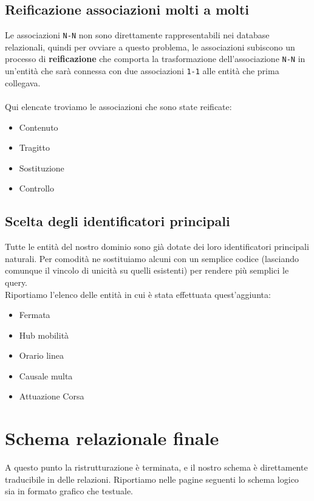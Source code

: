 \documentclass[12pt,a4paper]{report}
\begin{document}
\subsection{Reificazione associazioni molti a molti}
Le associazioni \texttt{N-N} non sono direttamente rappresentabili nei database relazionali, quindi per ovviare a questo problema, le associazioni subiscono un processo di \textbf{reificazione} che comporta la trasformazione dell'associazione \texttt{N-N} in un'entità che sarà connessa con due associazioni \texttt{1-1} alle entità che prima collegava.\\ \\
Qui elencate troviamo le associazioni che sono state reificate:
\begin{itemize}
    \item Contenuto
    \item Tragitto
    \item Sostituzione
    \item Controllo
\end{itemize}

\subsection{Scelta degli identificatori principali}
Tutte le entità del nostro dominio sono già dotate dei loro identificatori principali naturali.
Per comodità ne sostituiamo alcuni con un semplice codice (lasciando comunque il vincolo di unicità su quelli esistenti) per rendere più semplici le query.\\
Riportiamo l'elenco delle entità in cui è stata effettuata quest'aggiunta:
\begin{itemize}
    \item Fermata
    \item Hub mobilità
    \item Orario linea
    \item Causale multa
    \item Attuazione Corsa
\end{itemize}

\section{Schema relazionale finale}\label{section:schema_relazionale}
A questo punto la ristrutturazione è terminata, e il nostro schema è direttamente traducibile in delle relazioni.
Riportiamo nelle pagine seguenti lo schema logico sia in formato grafico che testuale.
\end{document}
